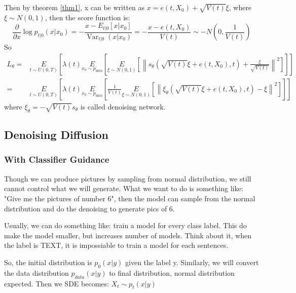 Then by theorem \ref{thm1}, x can be written as $x=e(t, X_0)+\sqrt{V(t)}\xi$, where $\xi\sim N(0, 1)$, then the score function is:
\begin{equation}
    \frac{\partial}{\partial x} \log p_{t | 0}\left(x | x_{0}\right)=-\frac{x-E_{t | 0}\left[x | x_{0}\right]}{\operatorname{Var}_{t | 0}\left(x | x_{0}\right)}=-\frac{x-e(t, X_0)}{V(t)}\sim -N\left(0, \frac{1}{V(t)}\right)
\end{equation}
So
\begin{equation}
\begin{aligned}
    L_\theta=&\underset{t\sim U(0,T)}{E}\left[\lambda (t)\underset{x_0\sim p_{data}}{E}\left[\underset{\xi\sim N(0, 1)}{E}\left[\left\|s_\theta\left(\sqrt{V(t)}\xi+e(t, X_0), t\right) + \frac{\xi}{\sqrt{V(t)}}\right\|^2\right]\right]\right]\\
    =&\underset{t\sim U(0,T)}{E}\left[\lambda (t)\underset{x_0\sim p_{data}}{E}\left[\frac{1}{V(t)}\underset{\xi\sim N(0, 1)}{E}\left[\left\|\xi_\theta\left(\sqrt{V(t)}\xi+e(t, X_0), t\right)-\xi\right\|^2\right]\right]\right]
\end{aligned}    
\end{equation}
where $\xi_\theta = -\sqrt{V(t)}s_\theta$ is called denoising network.

\subsection{Denoising Diffusion}

\subsubsection{With Classifier Guidance}
Though we can produce pictures by sampling from normal distribution, we still cannot control what we will generate. What we want to do is something like:
"Give me the pictures of number 6", then the model can sample from the normal distribution and do the denoising to generate pics of 6. 

Usually, we can do something like: train a model for every class label. This do make the model smaller, but increases number of models. 
Think about it, when the label is TEXT, it is impossiable to train a model for each sentences. 

So, the initial distribution is $p_0(x|y)$ given the label y. Similarly, we will convert the data distribution $p_{data}(x|y)$ to final distribution, normal distribution expected.
Then we SDE becomes: $X_t \sim p_t(x|y)$


